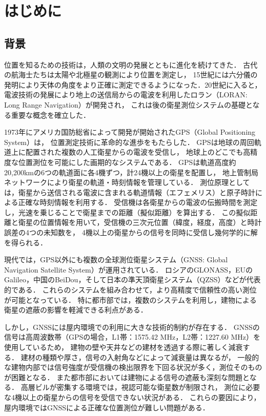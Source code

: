 \chapter{はじめに}
\thispagestyle{myheadings}


\section{背景}

位置を知るための技術は，人類の文明の発展とともに進化を続けてきた．
古代の航海士たちは太陽や北極星の観測により位置を測定し，
15世紀には六分儀の発明により天体の角度をより正確に測定できるようになった．20世紀に入ると，
電波技術の発展により地上の送信局からの電波を利用したロラン（LORAN: Long Range Navigation）が開発され，
これは後の衛星測位システムの基礎となる重要な概念を確立した．

1973年にアメリカ国防総省によって開発が開始されたGPS（Global Positioning System）は，
位置測定技術に革命的な進歩をもたらした．
GPSは地球の周回軌道上に配置された複数の人工衛星からの電波を受信し，
地球上のどこでも高精度な位置測位を可能にした画期的なシステムである．
GPSは軌道高度約20,200kmの6つの軌道面に各4機ずつ，計24機以上の衛星を配置し，
地上管制局ネットワークにより衛星の軌道・時刻情報を管理している．
測位原理としては，衛星から送信される電波に含まれる軌道情報（エフェメリス）と原子時計による正確な時刻情報を利用する．
受信機は各衛星からの電波の伝搬時間を測定し，光速を乗じることで衛星までの距離（擬似距離）を算出する．
この擬似距離と衛星の位置情報を用いて，受信機の三次元位置（緯度，経度，高度）と時計誤差の4つの未知数を，
4機以上の衛星からの信号を同時に受信し幾何学的に解を得られる．

現代では，GPS以外にも複数の全球測位衛星システム（GNSS: Global Navigation Satellite System）が運用されている．
ロシアのGLONASS，EUのGalileo，中国のBeiDou，そして日本の準天頂衛星システム（QZSS）などが代表的である．
これらのシステムを組み合わせて，より高精度で信頼性の高い測位が可能となっている．
特に都市部では，複数のシステムを利用し，建物による衛星の遮蔽の影響を軽減できる利点がある．

しかし，GNSSには屋内環境での利用に大きな技術的制約が存在する．
GNSSの信号は高周波数帯（GPSの場合，L1帯：1575.42 MHz，L2帯：1227.60 MHz）を使用しているため，
建物の壁や天井などの建材を透過する際に著しく減衰する．
建材の種類や厚さ，信号の入射角などによって減衰量は異なるが，
一般的な建物内部では信号強度が受信機の検出限界を下回る状況が多く，測位そのものが困難となる．
また都市部においては建物による信号の遮蔽も深刻な問題となる．
高層ビルが密集する環境では，視認可能な衛星数が制限され，
測位に必要な4機以上の衛星からの信号を受信できない状況がある．
これらの要因により，屋内環境ではGNSSによる正確な位置測位が難しい問題がある．

